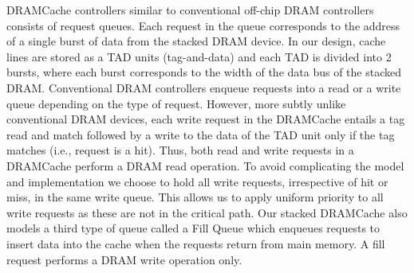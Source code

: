 \par DRAMCache controllers similar to conventional off-chip DRAM controllers consists of request queues. Each request in the queue corresponds to the address of a single burst of data from the stacked DRAM device.
In our design, cache lines are stored as a TAD units (tag-and-data) \cite{alloy} and each TAD is divided into 2 bursts, where each burst corresponds to the width of the data bus of the stacked DRAM.
Conventional DRAM controllers enqueue requests into a read or a write queue depending on the type of request. 
However, more subtly unlike conventional DRAM devices, each write request in the DRAMCache entails a tag read and match followed by a write to the data of the TAD unit only if the tag matches (i.e., request is a hit). Thus, both read and write requests in a DRAMCache perform a DRAM read operation. To avoid complicating the model and implementation we choose to hold all write requests, irrespective of hit or miss, in the same write queue. This allows us to apply uniform priority to all write requests as these are not in the critical path.
Our stacked DRAMCache also models a third type of queue called a Fill Queue \cite{dca} which enqueues requests to insert data into the cache when the requests return from main memory. A fill request performs a DRAM write operation only. 


